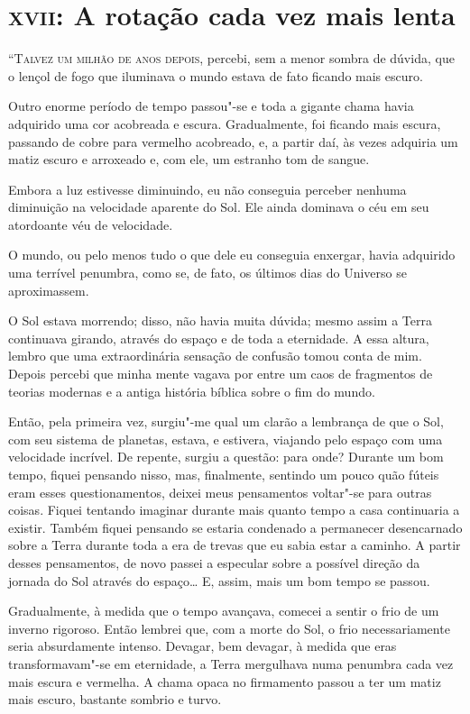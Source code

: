 \clearpage

\chapter{\textsc{xvii}:  A rotação cada vez mais lenta}

\textsc{“Talvez um milhão de anos depois,} percebi, sem a menor sombra de dúvida, que o lençol de fogo que iluminava o mundo
estava de fato ficando mais escuro.

Outro enorme período de tempo passou"-se e toda a gigante chama havia adquirido uma cor acobreada e escura.
Gradualmente, foi ficando mais escura, passando de cobre para vermelho acobreado, e, a partir daí, às vezes adquiria um
matiz escuro e arroxeado e, com ele, um estranho tom de sangue.

Embora a luz estivesse diminuindo, eu não conseguia perceber nenhuma diminuição na velocidade aparente do Sol. Ele
ainda dominava o céu em seu atordoante véu de velocidade. 

O mundo, ou pelo menos tudo o que dele eu conseguia enxergar, havia adquirido uma terrível penumbra, como se, de fato,
os últimos dias do Universo se aproximassem.

O Sol estava morrendo; disso, não havia muita dúvida; mesmo assim a Terra continuava girando, através do espaço e de
toda a eternidade. A essa altura, lembro que uma extraordinária sensação de confusão tomou conta de mim. Depois
percebi que minha mente vagava por entre um caos de fragmentos de teorias modernas e a antiga história bíblica sobre o
fim do mundo.

Então, pela primeira vez, surgiu"-me qual um clarão a lembrança de que o Sol, com seu sistema de planetas, estava, e
estivera, viajando pelo espaço com uma velocidade incrível. De repente, surgiu a questão: para onde? Durante um bom
tempo, fiquei pensando nisso, mas, finalmente, sentindo um pouco quão fúteis eram esses questionamentos, deixei meus
pensamentos voltar"-se para outras coisas. Fiquei tentando imaginar durante mais quanto tempo a casa continuaria a
existir. Também fiquei pensando se estaria condenado a permanecer desencarnado sobre a Terra durante toda a era de
trevas que eu sabia estar a caminho. A partir desses pensamentos, de novo passei a especular sobre a possível direção da
jornada do Sol através do espaço\ldots{} E, assim, mais um bom tempo se passou.

Gradualmente, à medida que o tempo avançava, comecei a sentir o frio de um inverno rigoroso. Então lembrei que, com a
morte do Sol, o frio necessariamente seria absurdamente intenso. Devagar, bem devagar, à medida que eras
transformavam"-se em eternidade, a Terra mergulhava numa penumbra cada vez mais escura e vermelha. A chama opaca no
firmamento passou a ter um matiz mais escuro, bastante sombrio e turvo.

